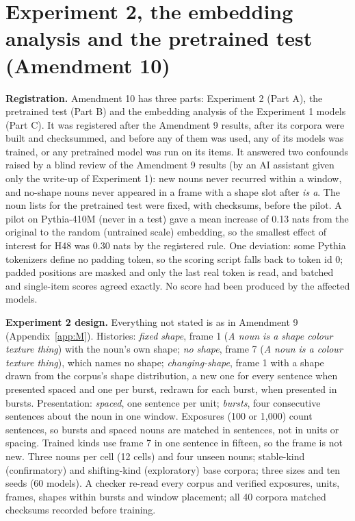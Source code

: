 \FloatBarrier
\section{Experiment 2, the embedding analysis and the pretrained test (Amendment 10)}\label{app:N}
\setcounter{table}{0}
\setcounter{figure}{0}
\textbf{Registration.} Amendment 10 has three parts: Experiment 2 (Part A), the pretrained test (Part B) and the embedding analysis of the Experiment 1 models (Part C). It was registered after the Amendment 9 results, after its corpora were built and checksummed, and before any of them was used, any of its models was trained, or any pretrained model was run on its items. It answered two confounds raised by a blind review of the Amendment 9 results (by an AI assistant given only the write-up of Experiment 1): new nouns never recurred within a window, and no-shape nouns never appeared in a frame with a shape slot after \emph{is a}. The noun lists for the pretrained test were fixed, with checksums, before the pilot. A pilot on Pythia-410M (never in a test) gave a mean increase of 0.13 nats from the original to the random (untrained scale) embedding, so the smallest effect of interest for H48 was 0.30 nats by the registered rule. One deviation: some Pythia tokenizers define no padding token, so the scoring script falls back to token id 0; padded positions are masked and only the last real token is read, and batched and single-item scores agreed exactly. No score had been produced by the affected models.

\textbf{Experiment 2 design.} Everything not stated is as in Amendment 9 (Appendix~\ref{app:M}). Histories: \emph{fixed shape}, frame 1 (\emph{A \textit{noun} is a \textit{shape} \textit{colour} \textit{texture} thing}) with the noun's own shape; \emph{no shape}, frame 7 (\emph{A \textit{noun} is a \textit{colour} \textit{texture} thing}), which names no shape; \emph{changing-shape}, frame 1 with a shape drawn from the corpus's shape distribution, a new one for every sentence when presented spaced and one per burst, redrawn for each burst, when presented in bursts. Presentation: \emph{spaced}, one sentence per unit; \emph{bursts}, four consecutive sentences about the noun in one window. Exposures (100 or 1,000) count sentences, so bursts and spaced nouns are matched in sentences, not in units or spacing. Trained kinds use frame 7 in one sentence in fifteen, so the frame is not new. Three nouns per cell (12 cells) and four unseen nouns; stable-kind (confirmatory) and shifting-kind (exploratory) base corpora; three sizes and ten seeds (60 models). A checker re-read every corpus and verified exposures, units, frames, shapes within bursts and window placement; all 40 corpora matched checksums recorded before training.

